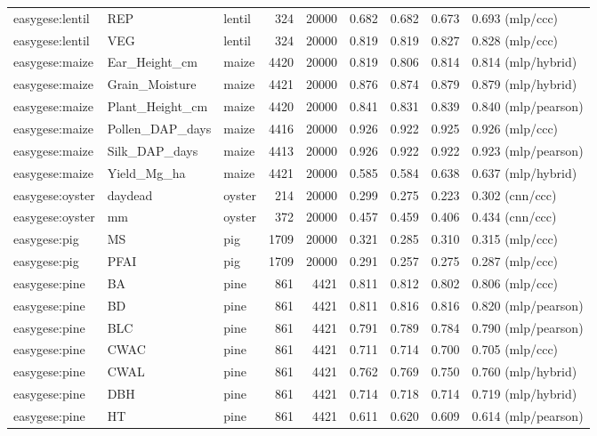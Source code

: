 \begin{longtable}{@{}p{2.25cm}p{1.35cm}p{1.85cm}rrcccp{2.7cm}@{}}
easygese:lentil & REP & lentil & 324 & 20000 & 0.682 & 0.682 & 0.673 & 0.693 (mlp/ccc) \\
easygese:lentil & VEG & lentil & 324 & 20000 & 0.819 & 0.819 & 0.827 & 0.828 (mlp/ccc) \\
easygese:maize & Ear\_\allowbreak{}Height\_\allowbreak{}cm & maize & 4420 & 20000 & 0.819 & 0.806 & 0.814 & 0.814 (mlp/hybrid) \\
easygese:maize & Grain\_\allowbreak{}Moisture & maize & 4421 & 20000 & 0.876 & 0.874 & 0.879 & 0.879 (mlp/hybrid) \\
easygese:maize & Plant\_\allowbreak{}Height\_\allowbreak{}cm & maize & 4420 & 20000 & 0.841 & 0.831 & 0.839 & 0.840 (mlp/pearson) \\
easygese:maize & Pollen\_\allowbreak{}DAP\_\allowbreak{}days & maize & 4416 & 20000 & 0.926 & 0.922 & 0.925 & 0.926 (mlp/ccc) \\
easygese:maize & Silk\_\allowbreak{}DAP\_\allowbreak{}days & maize & 4413 & 20000 & 0.926 & 0.922 & 0.922 & 0.923 (mlp/pearson) \\
easygese:maize & Yield\_\allowbreak{}Mg\_\allowbreak{}ha & maize & 4421 & 20000 & 0.585 & 0.584 & 0.638 & 0.637 (mlp/hybrid) \\
easygese:oyster & daydead & oyster & 214 & 20000 & 0.299 & 0.275 & 0.223 & 0.302 (cnn/ccc) \\
easygese:oyster & mm & oyster & 372 & 20000 & 0.457 & 0.459 & 0.406 & 0.434 (cnn/ccc) \\
easygese:pig & MS & pig & 1709 & 20000 & 0.321 & 0.285 & 0.310 & 0.315 (mlp/ccc) \\
easygese:pig & PFAI & pig & 1709 & 20000 & 0.291 & 0.257 & 0.275 & 0.287 (mlp/ccc) \\
easygese:pine & BA & pine & 861 & 4421 & 0.811 & 0.812 & 0.802 & 0.806 (mlp/ccc) \\
easygese:pine & BD & pine & 861 & 4421 & 0.811 & 0.816 & 0.816 & 0.820 (mlp/pearson) \\
easygese:pine & BLC & pine & 861 & 4421 & 0.791 & 0.789 & 0.784 & 0.790 (mlp/pearson) \\
easygese:pine & CWAC & pine & 861 & 4421 & 0.711 & 0.714 & 0.700 & 0.705 (mlp/ccc) \\
easygese:pine & CWAL & pine & 861 & 4421 & 0.762 & 0.769 & 0.750 & 0.760 (mlp/hybrid) \\
easygese:pine & DBH & pine & 861 & 4421 & 0.714 & 0.718 & 0.714 & 0.719 (mlp/hybrid) \\
easygese:pine & HT & pine & 861 & 4421 & 0.611 & 0.620 & 0.609 & 0.614 (mlp/pearson) \\

\end{longtable}
